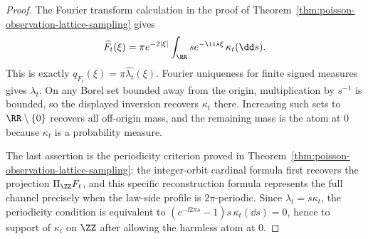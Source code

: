 \begin{proof}
The Fourier transform calculation in the proof of
Theorem~\ref{thm:poisson-observation-lattice-sampling} gives
\[
\widehat F_t(\xi)
=\pi e^{-2|\xi|}\int_{\RR}s e^{-\ii s\xi}\,\kappa_t(\dd s).
\]
This is exactly \(q_{F_t}(\xi)=\pi\widehat{\lambda_t}(\xi)\).  Fourier
uniqueness for finite signed measures gives \(\lambda_t\).  On any Borel set
bounded away from the origin, multiplication by \(s^{-1}\) is bounded, so the
displayed inversion recovers \(\kappa_t\) there.  Increasing such sets to
\(\RR\setminus\{0\}\) recovers all off-origin mass, and the remaining mass is
the atom at \(0\) because \(\kappa_t\) is a probability measure.

The last assertion is the periodicity criterion proved in
Theorem~\ref{thm:poisson-observation-lattice-sampling}: the integer-orbit
cardinal formula first recovers the projection \(\Pi_{\ZZ}F_t\), and this
specific reconstruction formula represents the full channel precisely when
the law-side profile is \(2\pi\)-periodic.  Since \(\lambda_t=s\kappa_t\), the
periodicity condition is equivalent to
\((e^{-\ii2\pi s}-1)s\,\kappa_t(\dd s)=0\), hence to support of \(\kappa_t\) on
\(\ZZ\) after allowing the harmless atom at \(0\).
\end{proof}
\fi

